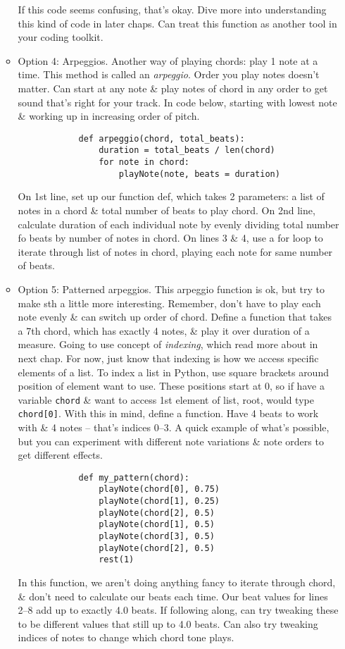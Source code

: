 \documentclass{article}
\begin{document}
\begin{itemize}
\begin{itemize}
		If this code seems confusing, that's okay. Dive more into understanding this kind of code in later chaps. Can treat this function as another tool in your coding toolkit.
		\item {\sf Option 4: Arpeggios.} Another way of playing chords: play 1 note at a time. This method is called an {\it arpeggio}. Order you play notes doesn't matter. Can start at any note \& play notes of chord in any order to get sound that's right for your track. In code below, starting with lowest note \& working up in increasing order of pitch.
		\begin{verbatim}
			def arpeggio(chord, total_beats):
			    duration = total_beats / len(chord)
			    for note in chord:
			        playNote(note, beats = duration)
		\end{verbatim}
		On 1st line, set up our function def, which takes 2 parameters: a list of notes in a chord \& total number of beats to play chord. On 2nd line, calculate duration of each individual note by evenly dividing total number fo beats by number of notes in chord. On lines 3 \& 4, use a for loop to iterate through list of notes in chord, playing each note for same number of beats.
		\item {\sf Option 5: Patterned arpeggios.} This arpeggio function is ok, but try to make sth a little more interesting. Remember, don't have to play each note evenly \& can switch up order of chord. Define a function that takes a 7th chord, which has exactly 4 notes, \& play it over duration of a measure. Going to use concept of {\it indexing}, which read more about in next chap. For now, just know that indexing is how we access specific elements of a list. To index a list in Python, use square brackets around position of element want to use. These positions start at 0, so if have a variable {\tt chord} \& want to access 1st element of list, root, would type {\tt chord[0]}. With this in mind, define a function. Have 4 beats to work with \& 4 notes -- that's indices 0--3. A quick example of what's possible, but you can experiment with different note variations \& note orders to get different effects.
		\begin{verbatim}
			def my_pattern(chord):
			    playNote(chord[0], 0.75)
			    playNote(chord[1], 0.25)
			    playNote(chord[2], 0.5)
			    playNote(chord[1], 0.5)
			    playNote(chord[3], 0.5)
			    playNote(chord[2], 0.5)
			    rest(1)
		\end{verbatim}
		In this function, we aren't doing anything fancy to iterate through chord, \& don't need to calculate our beats each time. Our beat values for lines 2--8 add up to exactly 4.0 beats. If following along, can try tweaking these to be different values that still up to 4.0 beats. Can also try tweaking indices of notes to change which chord tone plays.

\end{itemize}
\end{itemize}
\end{document}
